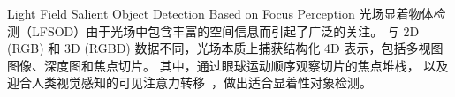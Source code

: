 %
%
%
%
%
%
%
%


{Light Field Salient Object Detection Based on Focus Perception}
\label{chap:part3}
%
%
光场显着物体检测（LFSOD）由于光场中包含丰富的空间信息而引起了广泛的关注。
与 2D (RGB) 和 3D (RGBD) 数据不同，光场本质上捕获结构化 4D 表示，包括多视图图像、深度图和焦点切片。 其中，通过眼球运动顺序观察切片的焦点堆栈，
以及迎合人类视觉感知的可见注意力转移~\cite{piao2020dut}，做出适合显着性对象检测。






